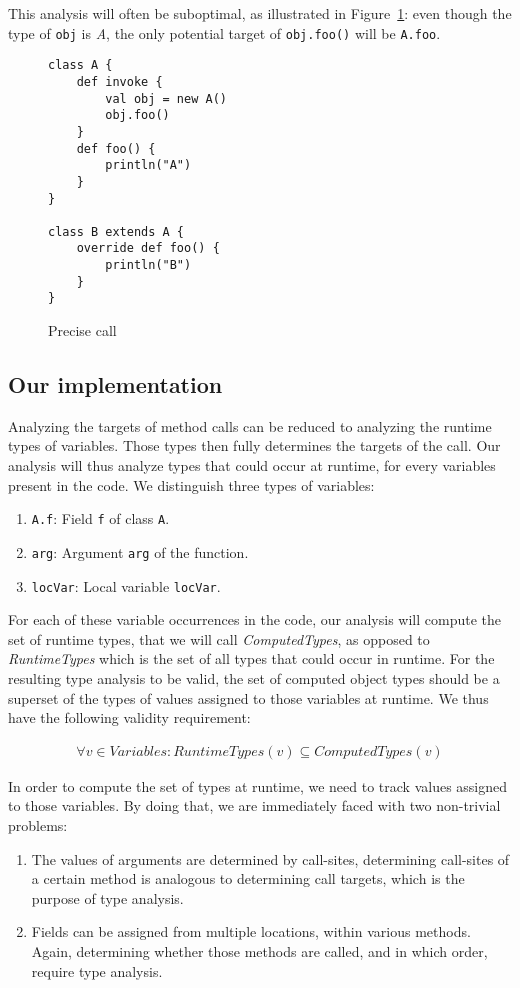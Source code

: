 This analysis will often be suboptimal, as illustrated in
Figure~\ref{fig:ta:example2}: even though the type of \verb/obj/ is \emph{A},
the only potential target of \verb/obj.foo()/ will be \verb/A.foo/.

\begin{figure}[h]
    \centering

\begin{lstlisting}
class A {
    def invoke {
        val obj = new A()
        obj.foo()
    }
    def foo() {
        println("A")
    }
}

class B extends A {
    override def foo() {
        println("B")
    }
}
\end{lstlisting}

    \caption{Precise call}
    \label{fig:ta:example2}
\end{figure}

\subsection{Our implementation}
Analyzing the targets of method calls can be reduced to analyzing the runtime
types of variables. Those types then fully determines the targets of the call.
Our analysis will thus analyze types that could occur at runtime, for every
variables present in the code. We distinguish three types of variables:
\begin{enumerate}
    \item \verb/A.f/: Field \verb/f/ of class \verb/A/.
    \item \verb/arg/: Argument \verb/arg/ of the function.
    \item \verb/locVar/: Local variable \verb/locVar/.
\end{enumerate}

For each of these variable occurrences in the code, our analysis will compute
the set of runtime types, that we will call \emph{ComputedTypes}, as opposed to
\emph{RuntimeTypes} which is the set of all types that could occur in runtime.
For the resulting type analysis to be valid, the set of computed object types
should be a superset of the types of values assigned to those variables at
runtime.  We thus have the following validity requirement:

\begin{eqnarray}
    \forall v \in Variables: RuntimeTypes(v) \subseteq ComputedTypes(v)
\end{eqnarray}

In order to compute the set of types at runtime, we need to track values
assigned to those variables. By doing that, we are immediately faced with two
non-trivial problems:
\begin{enumerate}
    \item The values of arguments are determined by call-sites, determining
    call-sites of a certain method is analogous to determining call targets,
    which is the purpose of type analysis.

    \item Fields can be assigned from multiple locations, within various
    methods. Again, determining whether those methods are
    called, and in which order, require type analysis.
\end{enumerate}

